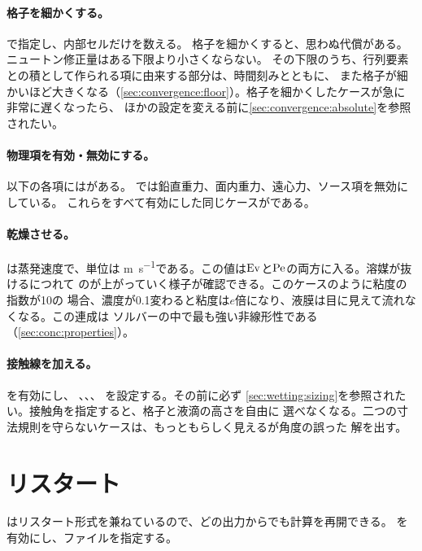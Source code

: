\paragraph{格子を細かくする。} で指定し、内部セルだけを数える。
格子を細かくすると、思わぬ代償がある。ニュートン修正量はある下限より小さくならない。
その下限のうち、行列要素との積として作られる項に由来する部分は、時間刻みとともに、
また格子が細かいほど大きくなる（\cref{sec:convergence:floor}）。格子を細かくしたケースが急に非常に遅くなったら、
ほかの設定を変える前に\cref{sec:convergence:absolute}を参照されたい。

\paragraph{物理項を有効・無効にする。} 以下の各項にはがある。
では鉛直重力、面内重力、遠心力、ソース項を無効にしている。
これらをすべて有効にした同じケースがである。

\paragraph{乾燥させる。} は蒸発速度で、単位は
\si{\metre\per\second}である。この値は$\mathrm{Ev}$と$\mathrm{Pe}$の両方に入る。溶媒が抜けるにつれて
のが上がっていく様子が確認できる。このケースのように粘度の指数が10の
場合、濃度が0.1変わると粘度は$e$倍になり、液膜は目に見えて流れなくなる。この連成は
ソルバーの中で最も強い非線形性である（\cref{sec:conc:properties}）。

\paragraph{接触線を加える。} を有効にし、
、、、
を設定する。その前に必ず
\cref{sec:wetting:sizing}を参照されたい。接触角を指定すると、格子と液滴の高さを自由に
選べなくなる。二つの寸法規則を守らないケースは、もっともらしく見えるが角度の誤った
解を出す。

\section{リスタート}
\label{sec:firstrun:restart}

はリスタート形式を兼ねているので、どの出力からでも計算を再開できる。
を有効にし、ファイルを指定する。


